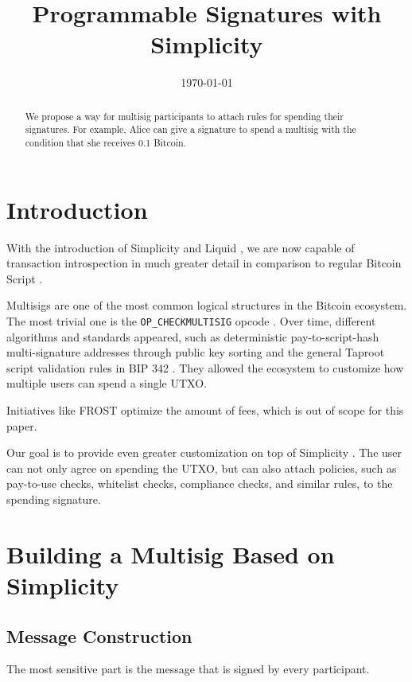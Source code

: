 \documentclass[11pt]{article}
\title{Programmable Signatures with Simplicity}
\date{\today}
\begin{document}
\maketitle

\begin{abstract}
We propose a way for multisig participants to attach rules for spending their signatures.
For example, Alice can give a signature to spend a multisig with the condition that she receives 0.1 Bitcoin.
\end{abstract}

\section{Introduction}

With the introduction of Simplicity and Liquid \cite{simplicity,liquid}, we are now capable of transaction introspection
in much greater detail in comparison to regular Bitcoin Script \cite{bitcoin-whitepaper,bitcoin-dev-transactions}.

Multisigs are one of the most common logical structures in the Bitcoin ecosystem.
The most trivial one is the \texttt{OP\_CHECKMULTISIG} opcode \cite{bip11}.
Over time, different algorithms and standards appeared, such as deterministic pay-to-script-hash multi-signature addresses through public key sorting \cite{bip67}
and the general Taproot script validation rules in BIP 342 \cite{bip342}.
They allowed the ecosystem to customize how multiple users can spend a single UTXO.

Initiatives like FROST \cite{frost} optimize the amount of fees, which is out of scope for this paper.

Our goal is to provide even greater customization on top of Simplicity \cite{simplicity}.
The user can not only agree on spending the UTXO, but can also attach policies, such as pay-to-use checks, whitelist checks, compliance checks, and similar rules, to the spending signature.

\section{Building a Multisig Based on Simplicity}

\subsection{Message Construction}

The most sensitive part is the message that is signed by every participant.
\end{document}
